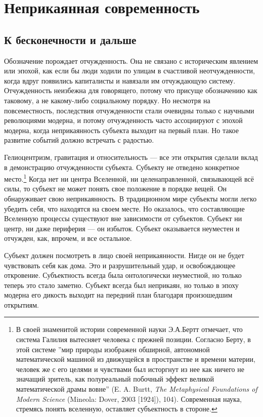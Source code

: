 \documentclass[12pt]{book}
\begin{document}
\chapter{Неприкаянная современность}

\section{К бесконечности и дальше}

Обозначение порождает отчужденность. Она не связано с историческим явлением или эпохой, как если бы люди ходили по улицам в счастливой неотчужденности, когда вдруг появились капиталисты и навязали им отчуждающую систему. Отчужденность неизбежна для говорящего, потому что присуще обозначению как таковому, а не какому-либо социальному порядку. Но несмотря на повсеместность, последствия отчужденности стали очевидны только с научными революциями модерна, и потому отчужденность часто ассоциируют с эпохой модерна, когда неприкаянность субъекта выходит на первый план. Но такое развитие событий должно встречать с радостью.

Гелиоцентризм, гравитация и относительность --- все эти открытия сделали вклад в демонстрацию отчужденности субъекта. Субъекту не отведено конкретное место.\footnote{В своей знаменитой истории современной науки Э.А.Бертт отмечает, что система Галилия вытесняет человека с прежней позиции. Согласно Берту, в этой системе ''мир природы изображен обширной, автономной математической машиной из движущейся в пространстве и времени материи, человек же с его целями и чувствами был исторгнут из нее как ничего не значащий зритель, как полуреальный побочный эффект великой математической драмы вовне'' (E. A. Burtt, \textit{The Metaphysical Foundations of Modern Science} (Mineola: Dover, 2003 [1924]), 104). Современная наука, стремясь понять вселенную, оставляет субъектность в стороне.} Когда нет ни центра Вселенной, ни целенаправленной, связывающей всё силы, то субъект не может понять свое положение в порядке вещей. Он обнаруживает свою неприкаянность. В традиционном мире субъекты могли легко убедить себя, что находятся на своем месте. Но оказалось, что составляющие Вселенную процессы существуют вне зависимости от субъектов. Субъект ни центр, ни даже периферия --- он избыток. Субъект оказывается неуместен и отчужден, как, впрочем, и все остальное.

Субъект должен посмотреть в лицо своей неприкаянности. Нигде он не будет чувствовать себя как дома. Это и разрушительный удар, и освобождающее откровение. Субъектность всегда была онтологически неуместной, но только теперь это стало заметно. Субъект всегда был неприкаян, но только в эпоху модерна его дикость выходит на передний план благодаря произошедшим открытиям.
\end{document}
